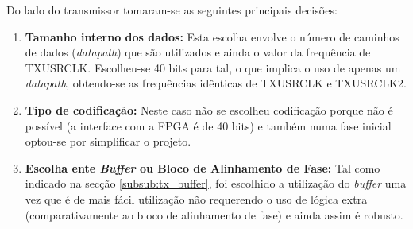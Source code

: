 Do lado do transmissor tomaram-se as seguintes principais decisões:
\begin{enumerate}
	\item \textbf{Tamanho interno dos dados:} Esta escolha envolve o número de caminhos de dados (\textit{datapath}) que são utilizados e ainda o valor da frequência de TXUSRCLK. Escolheu-se 40 bits para tal, o que implica o uso de apenas um \textit{datapath}, obtendo-se as frequências idênticas de TXUSRCLK e TXUSRCLK2.
	\item \textbf{Tipo de codificação:} Neste caso não se escolheu codificação porque não é possível (a interface com a FPGA é de 40 bits) e também numa fase inicial optou-se por simplificar o projeto.
	\item \textbf{Escolha ente \textit{Buffer} ou Bloco de Alinhamento de Fase:} Tal como indicado na secção \ref{subsub:tx_buffer}, foi escolhido a utilização do \textit{buffer} uma vez que é de mais fácil utilização não requerendo o uso de lógica extra (comparativamente ao bloco de alinhamento de fase) e ainda assim é robusto.
\end{enumerate}

